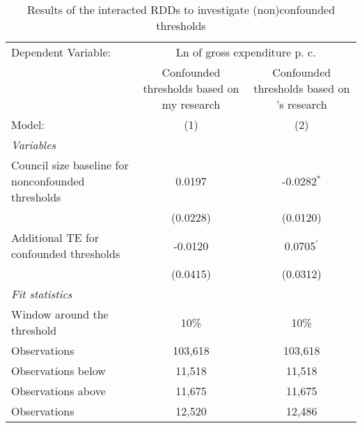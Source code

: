 
\begin{table}[htbp]
   \caption{\label{tab:rdd_conf_thresholds} Results of the interacted \ac{RDD}s to investigate (non)confounded thresholds}
   \centering
   \begin{tabular}{lcc}
      \tabularnewline \midrule \midrule
      Dependent Variable: & \multicolumn{2}{c}{Ln of gross expenditure p. c.}\\
                                                                              & Confounded thresholds based on my research & Confounded thresholds based on \citeauthor{Hohmann.2017}'s \parencite*{Hohmann.2017} research \\     
      Model:                                                                  & (1)                                        & (2)\\  
      \midrule
      \emph{Variables}\\
      Council size baseline for nonconfounded thresholds                      & 0.0197                                     & -0.0282$^{*}$\\   
                                                                              & (0.0228)                                   & (0.0120)\\   
      Additional TE for confounded thresholds                                 & -0.0120                                    & 0.0705$^{'}$\\   
                                                                              & (0.0415)                                   & (0.0312)\\   
      \midrule
      \emph{Fit statistics}\\
      Window around the threshold                                             & 10\%                                       & 10\%\\   
      Observations                                                            & 103,618                                    & 103,618\\  
      Observations below                                                      & 11,518                                     & 11,518\\  
      Observations above                                                      & 11,675                                     & 11,675\\  
      Observations                                                            & 12,520                                     & 12,486\\  

\end{tabular}
\end{table}
